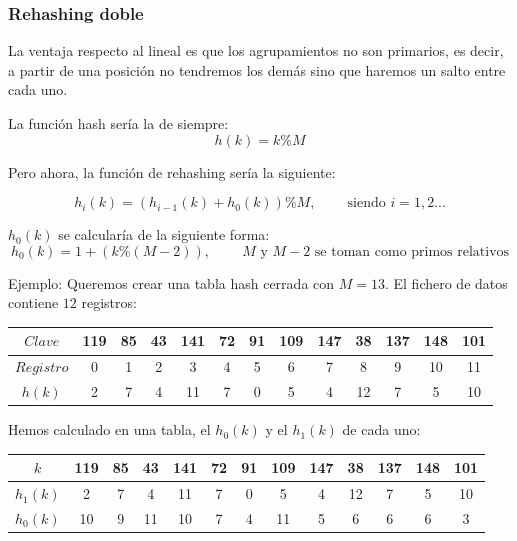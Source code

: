 \documentclass[10pt,a4paper,spanish]{report}
\begin{document}
\subsubsection{\textcolor[rgb]{0.3,0.4,0.8}Rehashing doble}
\noindent
La ventaja respecto al lineal es que los agrupamientos no son primarios, es decir, a partir de una posición no tendremos los demás sino que haremos un salto entre cada uno.

\noindent
La función hash sería la de siempre:
\begin{displaymath}
h(k) = k \% M
\end{displaymath}

\noindent
Pero ahora, la función de rehashing sería la siguiente:

\begin{displaymath}
h_i(k) = (h_{i-1}(k) + h_0(k)) \% M, \qquad\ \textrm{siendo $i = 1,2...$}
\end{displaymath}

\noindent
$h_0(k)$ se calcularía de la siguiente forma:
\begin{displaymath}
h_0(k) = 1 + (k \% (M-2)), \qquad\ \textrm{$M$ y $M-2$ se toman como primos relativos}
\end{displaymath}

\noindent
Ejemplo: Queremos crear una tabla hash cerrada con $M=13$. El fichero de datos contiene $12$ registros:

\label{ejemplo2}

\begin{tabular}{|c|c|c|c|c|c|c|c|c|c|c|c|c|}
\hline
$Clave$ & 119 & 85 & 43 & 141 & 72 & 91 & 109 &147 & 38 & 137 & 148 & 101 \\
\hline
$Registro$ & 0 & 1 & 2 & 3 & 4 & 5 & 6 & 7 & 8 & 9 & 10 & 11 \\
\hline
$h(k)$ & 2 & 7 & 4 & 11 & 7 & 0 & 5 & 4 & 12 & 7 & 5 & 10 \\
\hline
\end{tabular}

\noindent
Hemos calculado en una tabla, el $h_0(k)$ y el $h_1(k)$ de cada uno:

\begin{tabular}{|c|c|c|c|c|c|c|c|c|c|c|c|c|}
\hline
$k$ & 119 & 85 & 43 & 141 & 72 & 91 & 109 &147 & 38 & 137 & 148 & 101 \\
\hline
$h_1 (k)$ & 2 & 7 & 4 & 11 & 7 & 0 & 5 & 4 & 12 & 7 & 5 & 10 \\
\hline
$h_0 (k)$ & 10 & 9 & 11 & 10 & 7 & 4 & 11 & 5 & 6 & 6 & 6 & 3 \\
\hline
\end{tabular}
\end{document}
